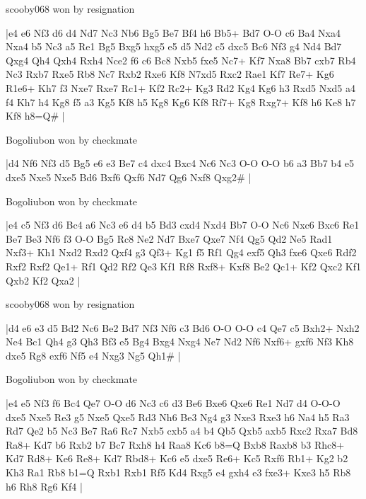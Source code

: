 \showboard

scooby068 won by resignation

\makegametitle
|e4 e6 Nf3 d6 d4 Nd7 Nc3 Nb6 Bg5 Be7 Bf4 h6 Bb5+ Bd7 O-O c6 Ba4 Nxa4 Nxa4 b5 Nc3 a5 Re1 Bg5 Bxg5 hxg5 e5 d5 Nd2 c5 dxc5 Bc6 Nf3 g4 Nd4 Bd7 Qxg4 Qh4 Qxh4 Rxh4 Nce2 f6 c6 Bc8 Nxb5 fxe5 Nc7+ Kf7 Nxa8 Bb7 cxb7 Rb4 Nc3 Rxb7 Rxe5 Rb8 Nc7 Rxb2 Rxe6 Kf8 N7xd5 Rxc2 Rae1 Kf7 Re7+ Kg6 R1e6+ Kh7 f3 Nxe7 Rxe7 Rc1+ Kf2 Rc2+ Kg3 Rd2 Kg4 Kg6 h3 Rxd5 Nxd5 a4 f4 Kh7 h4 Kg8 f5 a3 Kg5 Kf8 h5 Kg8 Kg6 Kf8 Rf7+ Kg8 Rxg7+ Kf8 h6 Ke8 h7 Kf8 h8=Q\#  |

\showboard

Bogoliubon won by checkmate

\makegametitle
|d4 Nf6 Nf3 d5 Bg5 e6 e3 Be7 c4 dxc4 Bxc4 Nc6 Nc3 O-O O-O b6 a3 Bb7 b4 e5 dxe5 Nxe5 Nxe5 Bd6 Bxf6 Qxf6 Nd7 Qg6 Nxf8 Qxg2\#  |

\showboard

Bogoliubon won by checkmate

\makegametitle
|e4 c5 Nf3 d6 Bc4 a6 Nc3 e6 d4 b5 Bd3 cxd4 Nxd4 Bb7 O-O Nc6 Nxc6 Bxc6 Re1 Be7 Be3 Nf6 f3 O-O Bg5 Rc8 Ne2 Nd7 Bxe7 Qxe7 Nf4 Qg5 Qd2 Ne5 Rad1 Nxf3+ Kh1 Nxd2 Rxd2 Qxf4 g3 Qf3+ Kg1 f5 Rf1 Qg4 exf5 Qh3 fxe6 Qxe6 Rdf2 Rxf2 Rxf2 Qe1+ Rf1 Qd2 Rf2 Qe3 Kf1 Rf8 Rxf8+ Kxf8 Be2 Qc1+ Kf2 Qxc2 Kf1 Qxb2 Kf2 Qxa2  |

\showboard

scooby068 won by resignation

\makegametitle
|d4 e6 e3 d5 Bd2 Nc6 Be2 Bd7 Nf3 Nf6 c3 Bd6 O-O O-O c4 Qe7 c5 Bxh2+ Nxh2 Ne4 Bc1 Qh4 g3 Qh3 Bf3 e5 Bg4 Bxg4 Nxg4 Ne7 Nd2 Nf6 Nxf6+ gxf6 Nf3 Kh8 dxe5 Rg8 exf6 Nf5 e4 Nxg3 Ng5 Qh1\#  |

\showboard

Bogoliubon won by checkmate

\makegametitle
|e4 e5 Nf3 f6 Bc4 Qe7 O-O d6 Nc3 c6 d3 Be6 Bxe6 Qxe6 Re1 Nd7 d4 O-O-O dxe5 Nxe5 Re3 g5 Nxe5 Qxe5 Rd3 Nh6 Be3 Ng4 g3 Nxe3 Rxe3 h6 Na4 h5 Ra3 Rd7 Qe2 b5 Nc3 Be7 Ra6 Rc7 Nxb5 cxb5 a4 b4 Qb5 Qxb5 axb5 Rxc2 Rxa7 Bd8 Ra8+ Kd7 b6 Rxb2 b7 Bc7 Rxh8 h4 Raa8 Kc6 b8=Q Bxb8 Raxb8 b3 Rhc8+ Kd7 Rd8+ Ke6 Re8+ Kd7 Rbd8+ Kc6 e5 dxe5 Re6+ Kc5 Rxf6 Rb1+ Kg2 b2 Kh3 Ra1 Rb8 b1=Q Rxb1 Rxb1 Rf5 Kd4 Rxg5 e4 gxh4 e3 fxe3+ Kxe3 h5 Rb8 h6 Rh8 Rg6 Kf4  |

